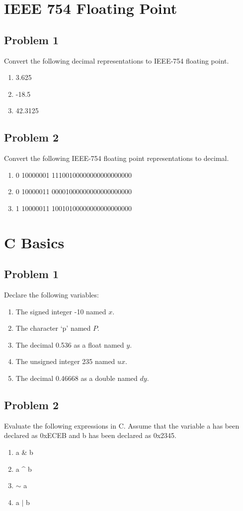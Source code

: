 \documentclass{article}
\begin{document}
\newpage
\section*{IEEE 754 Floating Point}
\subsection*{Problem 1}
Convert the following decimal representations to IEEE-754 floating point.
\begin{enumerate}[label=\alph*.]
    \item 3.625
    \item -18.5
    \item 42.3125
\end{enumerate}

\subsection*{Problem 2}
Convert the following IEEE-754 floating point representations to decimal.
\begin{enumerate}[label=\alph*.]
    \item 0 10000001 11100100000000000000000
    \item 0 10000011 00001000000000000000000
    \item 1 10000011 10010100000000000000000
\end{enumerate}

\section*{C Basics} 
\subsection*{Problem 1}
    Declare the following variables:
        \begin{enumerate}[label=\alph*.]
            \item The signed integer -10 named $x$.
            \item The character `p' named $P$.
            \item The decimal 0.536 as a float named $y$.
            \item The unsigned integer 235 named $ux$.
            \item The decimal 0.46668 as a double named $dy$.
        \end{enumerate}
\subsection*{Problem 2}
    Evaluate the following expressions in C. Assume that the variable a has been declared as 0xECEB and b has been declared as 0x2345.
        \begin{enumerate}[label=\alph*.]
            \item a \& b
            \item a \^{} b
            \item $\sim$ a
            \item a $\mid$ b
        \end{enumerate}
\end{document}

